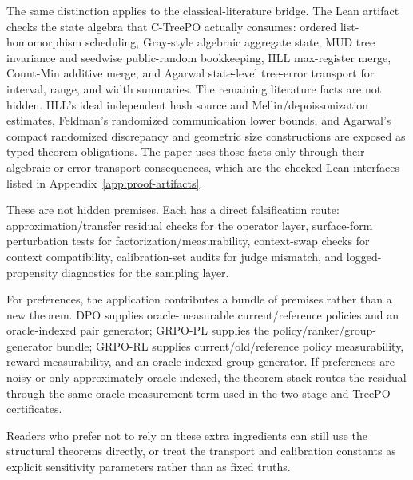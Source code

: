 The same distinction applies to the classical-literature bridge. The
Lean artifact checks the state algebra that C-TreePO actually consumes:
ordered list-homomorphism scheduling, Gray-style algebraic aggregate
state, MUD tree invariance and seedwise public-random bookkeeping, HLL
max-register merge, Count-Min additive merge, and Agarwal state-level
tree-error transport for interval, range, and width summaries. The
remaining literature facts are not hidden. HLL's ideal independent
hash source and Mellin/depoissonization estimates, Feldman's randomized
communication lower bounds, and Agarwal's compact randomized
discrepancy and geometric size constructions are exposed as typed
theorem obligations. The paper uses those facts only through their
algebraic or error-transport consequences, which are the checked Lean
interfaces listed in Appendix~\ref{app:proof-artifacts}.

These are not hidden premises. Each has a direct falsification route: approximation/transfer residual checks for the operator layer, surface-form perturbation tests for factorization/measurability, context-swap checks for context compatibility, calibration-set audits for judge mismatch, and logged-propensity diagnostics for the sampling layer.

For preferences, the application contributes a bundle of premises rather
than a new theorem. DPO supplies oracle-measurable current/reference
policies and an oracle-indexed pair generator; GRPO-PL supplies the
policy/ranker/group-generator bundle; GRPO-RL supplies current/old/reference
policy measurability, reward measurability, and an oracle-indexed group
generator. If preferences are noisy or only approximately oracle-indexed,
the theorem stack routes the residual through the same oracle-measurement
term used in the two-stage and TreePO certificates.

Readers who prefer not to rely on these extra ingredients can still use the structural theorems directly, or treat the transport and calibration constants as explicit sensitivity parameters rather than as fixed truths.
